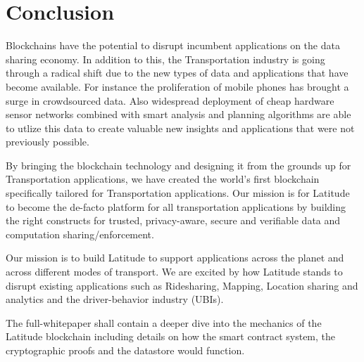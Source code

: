 \noindent
\section{Conclusion}
\label{sec:conc}

Blockchains have the potential to disrupt incumbent applications on the data sharing economy. In addition to this, the
Transportation industry is going through a radical shift due to the new types of data and applications that have become
available. For instance the proliferation of mobile phones has brought a surge in crowdsourced data. Also widespread
deployment of cheap hardware sensor networks combined with smart analysis and planning algorithms are able to utlize this
data to create valuable new insights and applications that were not previously possible.

By bringing the blockchain technology and designing it from the grounds up for Transportation applications, we have created
the world's first blockchain specifically tailored for Transportation applications. Our mission is for Latitude to become
the de-facto platform for all transportation applications by building the right constructs for trusted, privacy-aware,
secure and verifiable data and computation sharing/enforcement.

Our mission is to build Latitude to support applications across the planet and across different modes of transport. We
are excited by how Latitude stands to disrupt existing applications such as Ridesharing, Mapping, Location sharing and
analytics and the driver-behavior industry (UBIs).

The full-whitepaper shall contain a deeper dive into the mechanics of the Latitude blockchain including details on how
the smart contract system, the cryptographic proofs and the datastore would function.
